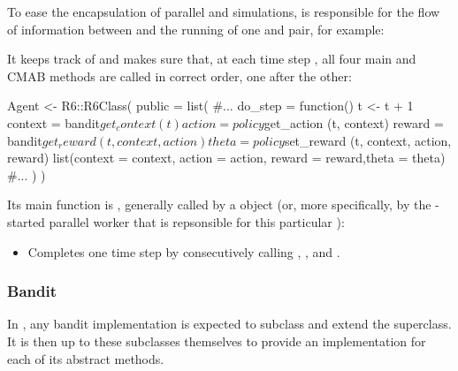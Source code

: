 \documentclass{jss}
\begin{document}
To ease the encapsulation of parallel  and  simulations,  is responsible for the flow of information between and the running of one  and  pair, for example:


It keeps track of  and makes sure that, at each time step , all four main  and  CMAB methods are called in correct order, one after the other:

\begin{Code}
Agent <- R6::R6Class(
  public = list(
    #...
    do_step = function() {
      t <- t + 1
      context = bandit$get_context(t)
      action  = policy$get_action (t, context)
      reward  = bandit$get_reward (t, context, action)
      theta   = policy$set_reward (t, context, action, reward)
      list(context = context, action = action, reward = reward,theta = theta)
    }
    #...
  )
)
\end{Code}

Its main function is , generally called by a  object (or, more specifically, by the -started parallel worker that is repsonsible for this particular ):

\begin{itemize}
   \item{}{
      Completes one time step  by consecutively calling
      , ,  and .
    }
\end{itemize}

\subsubsection{Bandit}

In , any bandit implementation is expected to subclass and extend the  superclass. It is then up to these subclasses themselves to provide an implementation for each of its abstract methods.
\end{document}
